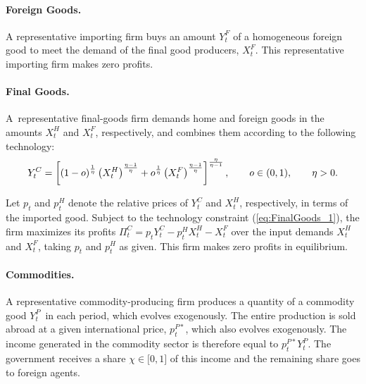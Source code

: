 \documentclass[12pt]{article}
\begin{document}
\paragraph{Foreign Goods.}

A representative importing firm buys an amount $Y_t^F$ of a homogeneous foreign good to meet the demand of the final good producers, $X_t^F$. This representative importing firm makes zero profits.

\paragraph{Final Goods.}

A\ representative final-goods firm demands home and foreign goods in the amounts $X_{t}^{H}$ and $X_{t}^{F}$, respectively, and combines them according to the following technology:%
\begin{equation}
Y_{t}^{C}=\left[ \left( 1-o\right) ^{\frac{1}{\eta }}\left( X_{t}^{H}\right)
^{\frac{\eta -1}{\eta }}+o^{\frac{1}{\eta }}\left( X_{t}^{F}\right) ^{\frac{%
\eta -1}{\eta }}\right] ^{\frac{\eta }{\eta -1}},\qquad o\in (0,1),\qquad
\eta >0.  \label{eq:FinalGoods_1}
\end{equation}%

Let $p_t$ and $p_{t}^{H}$ denote the relative prices of $Y_t^C$ and $X_{t}^{H}$, respectively, in terms of the imported good. Subject to the technology constraint (\ref{eq:FinalGoods_1}), the firm maximizes its profits $\Pi_{t}^{C}=p_tY_{t}^{C}-p_{t}^{H}X_{t}^{H}-X_{t}^{F}$ over the input demands $X_{t}^{H}$ and $X_{t}^{F}$, taking $p_t$ and $p_{t}^{H}$ as given. This firm makes zero profits in equilibrium.

\paragraph{Commodities.}

A representative commodity-producing firm produces a quantity of a commodity good $Y_{t}^{P}$\ in each period, which evolves exogenously. The entire production is sold abroad at a given international price, $p_{t}^{P*}$, which also evolves exogenously. The  income generated in the commodity sector is therefore equal to $p_{t}^{P*}Y_{t}^{P}$. The government receives a share $\chi \in \lbrack 0,1]$ of this income and the
remaining share goes to foreign agents.
\end{document}
